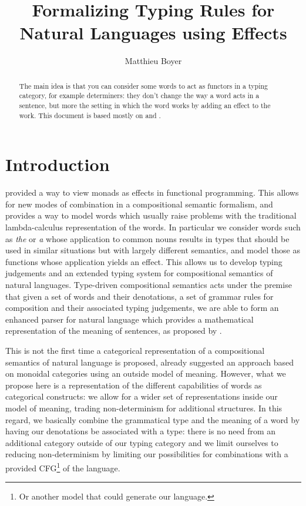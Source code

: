 \documentclass[math, english, info]{cours}
\title{Formalizing Typing Rules for Natural Languages using Effects}
\author{Matthieu Boyer}
\begin{document}
\bettertitle

\begin{abstract}
	The main idea is that you can consider some words to act as functors in a typing category, for example determiners:
	they don't change the way a word acts in a sentence,
	but more the setting in which the word works by adding an effect to the work.
	This document is based mostly on  and .
\end{abstract}

\section*{Introduction}
 provided a way to view monads as effects
in functional programming. This allows for new modes of combination in a compositional
semantic formalism, and provides a way to model words which usually raise problems with the
traditional lambda-calculus representation of the words. In particular we consider words such
as \textsl{the} or \textsl{a} whose application to common nouns results in types that should
be used in similar situations but with largely different semantics, and model those as
functions whose application yields an effect. This allows us to develop typing judgements and
an extended typing system for compositional semantics of natural languages.
Type-driven compositional semantics acts under the premise that given a set of words and their
denotations, a set of grammar rules for composition and their associated typing judgements,
we are able to form an enhanced parser for natural language which provides a mathematical
representation of the meaning of sentences, as proposed by .

\medskip

This is not the first time a categorical representation of a compositional semantics of
natural language is proposed, 
already suggested an approach based on monoidal categories using an outside model of meaning.
However, what we propose here is a representation of the different capabilities of words
as categorical constructs: we allow for a wider set of representations inside our
model of meaning, trading non-determinism for additional structures.
In this regard, we basically combine the grammatical type and the meaning of a word
by having our denotations be associated with a type: there is no need from an additional
category outside of our typing category and we limit ourselves to reducing non-determinism
by limiting our possibilities for combinations with a provided CFG\footnote{Or another model
	that could generate our language.} of the language.
\end{document}
